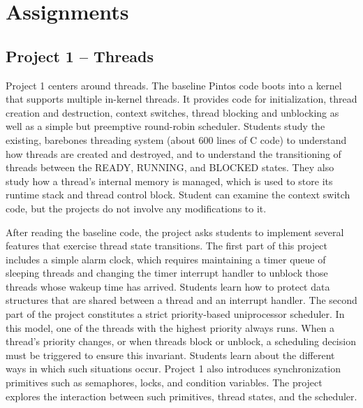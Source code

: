 \section{Assignments}
\label{sec:assignments}

%
%

\subsection{Project 1 -- Threads}
Project 1 centers around threads.  The baseline Pintos code boots into a kernel that
supports multiple in-kernel threads.  It provides code for initialization, thread creation and
destruction, context switches, thread blocking and unblocking as well as a simple but
preemptive round-robin scheduler.
Students study the existing, barebones threading system (about 600 lines of C code) to 
understand how threads are created and destroyed, and to understand the transitioning of 
threads between the READY, RUNNING, and BLOCKED states.  They also study how a thread's
internal memory is managed, which is used to store its runtime stack and thread control block.
Student can examine the context switch code, but the projects do not involve any modifications
to it.

After reading the baseline code, the project asks students to implement several features
that exercise thread state transitions.  The first part of this project includes a simple
alarm clock, which requires maintaining a timer queue of sleeping threads and changing 
the timer interrupt handler to unblock those threads whose wakeup time has arrived.
Students learn how to protect data structures that are shared between a thread and an
interrupt handler.  The second part of the project constitutes a strict priority-based
uniprocessor scheduler.  In this model, one of the threads with the highest priority
always runs.  When a thread's priority changes, or when threads block or unblock,  
a scheduling decision must be triggered to ensure this invariant.  Students learn about
the different ways in which such situations occur.  
Project 1 also introduces synchronization primitives such as semaphores, locks,
and condition variables.  The project explores the interaction between such primitives,
thread states, and the scheduler.

